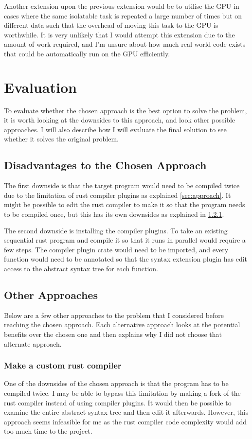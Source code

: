 \documentclass[12pt, a4paper]{article}
\begin{document}
Another extension upon the previous extension would be to utilise the GPU in cases where the same isolatable task is repeated a large number of times but on different data such that the overhead of moving this task to the GPU is worthwhile. It is very unlikely that I would attempt this extension due to the amount of work required, and I'm unsure about how much real world code exists that could be automatically run on the GPU efficiently.

\section{Evaluation}
To evaluate whether the chosen approach is the best option to solve the problem, it is worth looking at the downsides to this approach, and look other possible approaches. I will also describe how I will evaluate the final solution to see whether it solves the original problem.

\subsection{Disadvantages to the Chosen Approach}
The first downside is that the target program would need to be compiled twice due to the limitation of rust compiler plugins as explained \autoref{sec:approach}. It might be possible to edit the rust compiler to make it so that the program needs to be compiled once, but this has its own downsides as explained in \ref{sec:customrust}.

The second downside is installing the compiler plugins. To take an existing sequential rust program and compile it so that it runs in parallel would require a few steps. The compiler plugin crate would need to be imported, and every function would need to be annotated so that the syntax extension plugin has edit access to the abstract syntax tree for each function.

\subsection{Other Approaches}
Below are a few other approaches to the problem that I considered before reaching the chosen approach. Each alternative approach looks at the potential benefits over the chosen one and then explains why I did not choose that alternate approach.

\subsubsection{Make a custom rust compiler}
\label{sec:customrust}
One of the downsides of the chosen approach is that the program has to be compiled twice. I may be able to bypass this limitation by making a fork of the rust compiler instead of using compiler plugins. It would then be possible to examine the entire abstract syntax tree and then edit it afterwards. However, this approach seems infeasible for me as the rust compiler code complexity would add too much time to the project.
\end{document}
